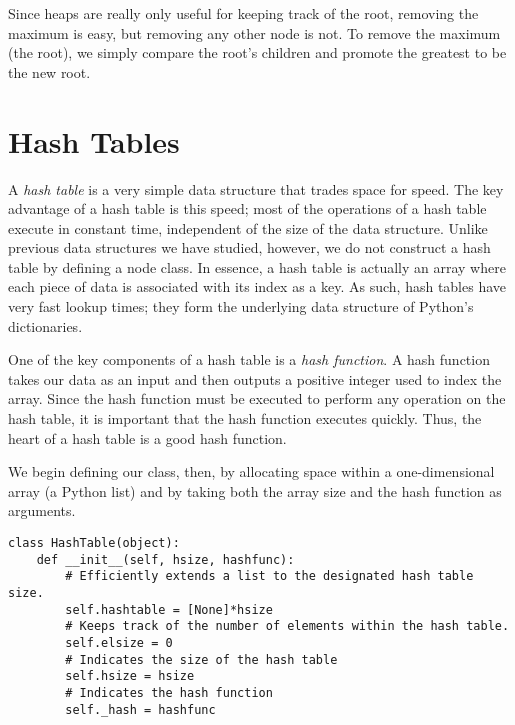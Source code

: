 Since heaps are really only useful for keeping track of the root, removing the maximum is easy, but removing any other node is not.
To remove the maximum (the root), we simply compare the root's children and promote the greatest to be the new root.

\section*{Hash Tables}
A \emph{hash table} is a very simple data structure that trades space for speed.
The key advantage of a hash table is this speed; most of the operations of a hash table execute in constant time, independent of the size of the data structure.
Unlike previous data structures we have studied, however, we do not construct a hash table by defining a node class.
In essence, a hash table is actually an array where each piece of data is associated with its index as a key.
As such, hash tables have very fast lookup times; they form the underlying data structure of Python's dictionaries.

One of the key components of a hash table is a \emph{hash function}.
A hash function takes our data as an input and then outputs a positive integer used to index the array.
Since the hash function must be executed to perform any operation on the hash table, it is important that the hash function executes quickly.
Thus, the heart of a hash table is a good hash function.

We begin defining our  class, then, by allocating space within a one-dimensional array (a Python list) and by taking both the array size and the hash function as arguments.
\begin{lstlisting}
class HashTable(object):
    def __init__(self, hsize, hashfunc):
        # Efficiently extends a list to the designated hash table size.
        self.hashtable = [None]*hsize
        # Keeps track of the number of elements within the hash table.
        self.elsize = 0
        # Indicates the size of the hash table
        self.hsize = hsize
        # Indicates the hash function
        self._hash = hashfunc
\end{lstlisting}

